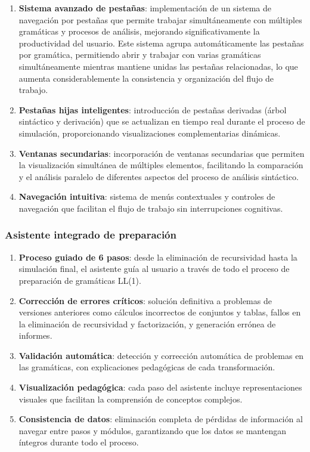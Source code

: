 \begin{enumerate}
    \item \textbf{Sistema avanzado de pestañas}: implementación de un sistema de navegación por pestañas que permite trabajar simultáneamente con múltiples gramáticas y procesos de análisis, mejorando significativamente la productividad del usuario. Este sistema agrupa automáticamente las pestañas por gramática, permitiendo abrir y trabajar con varias gramáticas simultáneamente mientras mantiene unidas las pestañas relacionadas, lo que aumenta considerablemente la consistencia y organización del flujo de trabajo.

    \item \textbf{Pestañas hijas inteligentes}: introducción de pestañas derivadas (árbol sintáctico y derivación) que se actualizan en tiempo real durante el proceso de simulación, proporcionando visualizaciones complementarias dinámicas.

    \item \textbf{Ventanas secundarias}: incorporación de ventanas secundarias que permiten la visualización simultánea de múltiples elementos, facilitando la comparación y el análisis paralelo de diferentes aspectos del proceso de análisis sintáctico.

    \item \textbf{Navegación intuitiva}: sistema de menús contextuales y controles de navegación que facilitan el flujo de trabajo sin interrupciones cognitivas.
\end{enumerate}

\subsubsection{Asistente integrado de preparación}

\begin{enumerate}
    \item \textbf{Proceso guiado de 6 pasos}: desde la eliminación de recursividad hasta la simulación final, el asistente guía al usuario a través de todo el proceso de preparación de gramáticas LL(1).

    \item \textbf{Corrección de errores críticos}: solución definitiva a problemas de versiones anteriores como cálculos incorrectos de conjuntos y tablas, fallos en la eliminación de recursividad y factorización, y generación errónea de informes.

    \item \textbf{Validación automática}: detección y corrección automática de problemas en las gramáticas, con explicaciones pedagógicas de cada transformación.

    \item \textbf{Visualización pedagógica}: cada paso del asistente incluye representaciones visuales que facilitan la comprensión de conceptos complejos.

    \item \textbf{Consistencia de datos}: eliminación completa de pérdidas de información al navegar entre pasos y módulos, garantizando que los datos se mantengan íntegros durante todo el proceso.
\end{enumerate}

